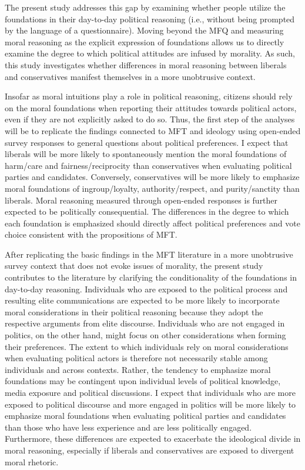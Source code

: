 \documentclass[12pt]{article}
\begin{document}
The present study addresses this gap by examining whether people utilize the foundations in their day-to-day political reasoning (i.e., without being prompted by the language of a questionnaire). Moving beyond the MFQ and measuring moral reasoning as the explicit expression of foundations allows us to directly examine the degree to which political attitudes are infused by morality. As such, this study investigates whether differences in moral reasoning between liberals and conservatives manifest themselves in a more unobtrusive context.

Insofar as moral intuitions play a role in political reasoning, citizens should rely on the moral foundations when reporting their attitudes towards political actors, even if they are not explicitly asked to do so. Thus, the first step of the analyses will be to replicate the findings connected to MFT and ideology using open-ended survey responses to general questions about political preferences. I expect that liberals will be more likely to spontaneously mention the moral foundations of harm/care and fairness/reciprocity than conservatives when evaluating political parties and candidates. Conversely, conservatives will be more likely to emphasize moral foundations of ingroup/loyalty, authority/respect, and purity/sanctity than liberals. Moral reasoning measured through open-ended responses is further expected to be politically consequential. The differences in the degree to which each foundation is emphasized should directly affect political preferences and vote choice consistent with the propositions of MFT.

After replicating the basic findings in the MFT literature in a more unobtrusive survey context that does not evoke issues of morality, the present study contributes to the literature by clarifying the conditionality of the foundations in day-to-day reasoning. Individuals who are exposed to the political process and resulting elite communications are expected to be more likely to incorporate moral considerations in their political reasoning because they adopt the respective arguments from elite discourse. Individuals who are not engaged in politics, on the other hand, might focus on other considerations when forming their preferences. The extent to which individuals rely on moral considerations when evaluating political actors is therefore not necessarily stable among individuals and across contexts. Rather, the tendency to emphasize moral foundations may be contingent upon individual levels of political knowledge, media exposure and political discussions. I expect that individuals who are more exposed to political discourse and more engaged in politics will be more likely to emphasize moral foundations when evaluating political parties and candidates than those who have less experience and are less politically engaged. Furthermore, these differences are expected to exacerbate the ideological divide in moral reasoning, especially if liberals and conservatives are exposed to divergent moral rhetoric.
\end{document}
